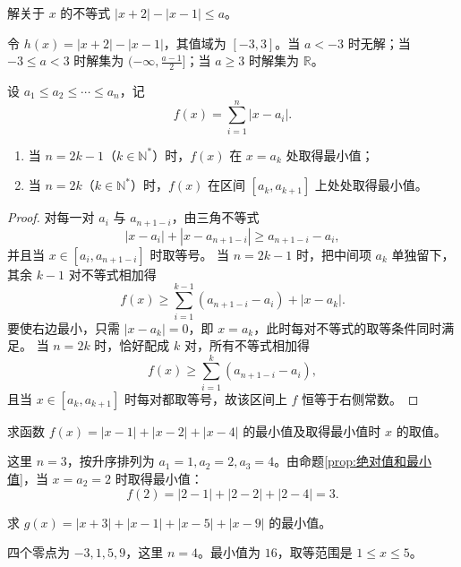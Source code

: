 \begin{exercise}
  解关于 \(x\) 的不等式 \(|x+2|-|x-1|\le a\)。
\end{exercise}
\begin{hint}
  令 \(h(x)=|x+2|-|x-1|\)，其值域为 \([-3,3]\)。当 \(a<-3\) 时无解；当 \(-3\le a<3\) 时解集为 \((-\infty,\frac{a-1}{2}]\)；当 \(a\ge3\) 时解集为 \(\mathbb R\)。
\end{hint}

\begin{proposition}[绝对值之和的最小值]\label{prop:绝对值和最小值}
  设 \(a_1\le a_2\le\cdots\le a_n\)，记
  \[
  f(x)=\sum_{i=1}^{n}|x-a_i|.
  \]
  \begin{enumerate}
    \item 当 \(n=2k-1\)（\(k\in\mathbb N^*\)）时，\(f(x)\) 在 \(x=a_k\) 处取得最小值；
    \item 当 \(n=2k\)（\(k\in\mathbb N^*\)）时，\(f(x)\) 在区间 \([a_k,a_{k+1}]\) 上处处取得最小值。
  \end{enumerate}
\end{proposition}
\begin{proof}
  对每一对 \(a_i\) 与 \(a_{n+1-i}\)，由三角不等式
  \[
  |x-a_i|+|x-a_{n+1-i}|\ge a_{n+1-i}-a_i,
  \]
  并且当 \(x\in[a_i,a_{n+1-i}]\) 时取等号。
  当 \(n=2k-1\) 时，把中间项 \(a_k\) 单独留下，其余 \(k-1\) 对不等式相加得
  \[
  f(x)\ge \sum_{i=1}^{k-1}(a_{n+1-i}-a_i)+|x-a_k|.
  \]
  要使右边最小，只需 \(|x-a_k|=0\)，即 \(x=a_k\)，此时每对不等式的取等条件同时满足。
  当 \(n=2k\) 时，恰好配成 \(k\) 对，所有不等式相加得
  \[
  f(x)\ge \sum_{i=1}^{k}(a_{n+1-i}-a_i),
  \]
  且当 \(x\in[a_k,a_{k+1}]\) 时每对都取等号，故该区间上 \(f\) 恒等于右侧常数。
\end{proof}

\begin{example}
  求函数 \(f(x)=|x-1|+|x-2|+|x-4|\) 的最小值及取得最小值时 \(x\) 的取值。
\end{example}
\begin{jie}
  这里 \(n=3\)，按升序排列为 \(a_1=1,a_2=2,a_3=4\)。由命题\ref{prop:绝对值和最小值}，当 \(x=a_2=2\) 时取得最小值：
  \[
  f(2)=|2-1|+|2-2|+|2-4|=3.
  \]
\end{jie}

\begin{exercise}
  求 \(g(x)=|x+3|+|x-1|+|x-5|+|x-9|\) 的最小值。
\end{exercise}
\begin{hint}
  四个零点为 \(-3,1,5,9\)，这里 \(n=4\)。最小值为 \(16\)，取等范围是 \(1\le x\le 5\)。
\end{hint}

